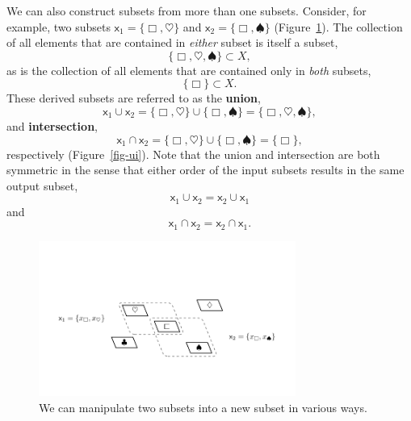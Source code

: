\documentclass[
  letterpaper,
  DIV=11,
  numbers=noendperiod]{scrartcl}
\begin{document}
We can also construct subsets from more than one subsets. Consider, for
example, two subsets \(\mathsf{x}_1 = \{ \Box, \heartsuit \}\) and
\(\mathsf{x}_2 = \{ \Box, \spadesuit \}\) (Figure~\ref{fig-subsets}).
The collection of all elements that are contained in \emph{either}
subset is itself a subset, \[
\{ \Box, \heartsuit, \spadesuit \} \subset X,
\] as is the collection of all elements that are contained only in
\emph{both} subsets, \[
\{ \Box \} \subset X.
\] These derived subsets are referred to as the \textbf{union}, \[
\mathsf{x}_1 \cup \mathsf{x}_2
= \{ \Box, \heartsuit \} \cup \{ \Box, \spadesuit \}
= \{ \Box, \heartsuit, \spadesuit \},
\] and \textbf{intersection}, \[
\mathsf{x}_1 \cap \mathsf{x}_2
= \{ \Box, \heartsuit \} \cup \{ \Box, \spadesuit \}
= \{ \Box \},
\] respectively (Figure~\ref{fig-ui}). Note that the union and
intersection are both symmetric in the sense that either order of the
input subsets results in the same output subset, \[
\mathsf{x}_1 \cup \mathsf{x}_2 = \mathsf{x}_2 \cup \mathsf{x}_1
\] and \[
\mathsf{x}_1 \cap \mathsf{x}_2 = \mathsf{x}_2 \cap \mathsf{x}_1.
\]

\begin{figure}

{\centering \includegraphics[width=0.75\textwidth,height=\textheight]{figures/overlapping_subsets/overlapping_subsets.pdf}

}

\caption{\label{fig-subsets}We can manipulate two subsets into a new
subset in various ways.}

\end{figure}
\end{document}
